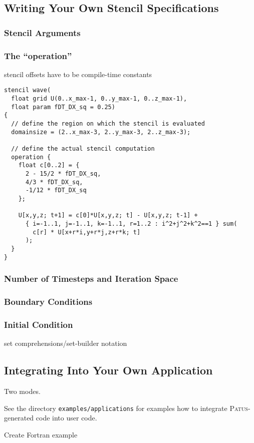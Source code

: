 \subsection{Writing Your Own Stencil Specifications}
\label{sec:stencilspec}

\subsubsection{Stencil Arguments}

\subsubsection{The ``operation''}

stencil offsets have to be compile-time constants

\begin{lstlisting}[language=stencil]
stencil wave(
  float grid U(0..x_max-1, 0..y_max-1, 0..z_max-1), 
  float param fDT_DX_sq = 0.25)
{
  // define the region on which the stencil is evaluated
  domainsize = (2..x_max-3, 2..y_max-3, 2..z_max-3);
  
  // define the actual stencil computation
  operation {
    float c[0..2] = {
      2 - 15/2 * fDT_DX_sq,
      4/3 * fDT_DX_sq,
      -1/12 * fDT_DX_sq
    };
    
    U[x,y,z; t+1] = c[0]*U[x,y,z; t] - U[x,y,z; t-1] +
      { i=-1..1, j=-1..1, k=-1..1, r=1..2 : i^2+j^2+k^2==1 } sum(
        c[r] * U[x+r*i,y+r*j,z+r*k; t]
      );
  }
}
\end{lstlisting}


\subsubsection{Number of Timesteps and Iteration Space}

\subsubsection{Boundary Conditions}

\subsubsection{Initial Condition}

set comprehensions/set-builder notation


\subsection{Integrating Into Your Own Application}

Two modes.

See the directory \texttt{examples/applications} for examples how to integrate \textsc{Patus}-generated code
into user code.


Create Fortran example